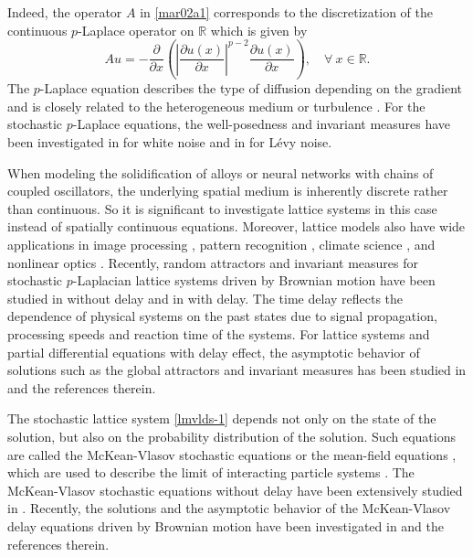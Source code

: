 \documentclass[11pt]{article}
\numberwithin{equation}{section}
\theoremstyle{plain}
\begin{document}
Indeed, the 
operator 
$A$ in \eqref{mar02a1} 
corresponds to the
discretization of the 
continuous $p$-Laplace
operator on 
$\mathbb{R}$ 
which is given by
 $$
   Au
   =    - \frac{\partial}{\partial x}                               \left(  \left|\frac{\partial u(x)}{\partial x} \right|^{p-2}
    \frac{\partial u(x)}{\partial x}
         \right) ,
         \quad \forall\  x\in \mathbb{R} .
$$
 The $p$-Laplace equation   describes  the type of diffusion depending on the gradient and is closely related to the heterogeneous medium or turbulence \cite{dt1994SIMA, ev1988ARMA}.
 For 
 the stochastic $p$-Laplace equations, 
 the well-posedness and invariant measures  have been investigated 
 in    \cite{sz2023SAA, bwang2026DCDSB, wliu2009JMAA, gt2016SIMA, wct2024JDE}
 for white noise
 and
 in    
  \cite{blz2014NA, neelima2022PA, km2025JEE} for
  L\'{e}vy noise.
  
   
  When modeling the solidification of alloys or neural networks with chains of coupled oscillators, the underlying spatial medium is inherently discrete rather than continuous.
  So it is significant to investigate lattice systems in 
 this case   instead of spatially continuous equations.  
  Moreover, lattice models also have wide applications in image processing \cite{cr1993IEEE}, pattern recognition \cite{cm1995IEEE}, climate science \cite{MT2016CPAM}, and nonlinear optics \cite{cls2003Nature}. 
  Recently, random attractors and invariant measures for stochastic $p$-Laplacian lattice systems
  driven by Brownian motion
   have been studied in \cite{WW2020SPA, WG2025Non} without  delay and 
   in \cite{ZL2025AMO} with  delay.
 The time    delay reflects the dependence of 
 physical systems on the past states due to   signal propagation, processing speeds and reaction time of the systems.   
  For  lattice systems
   and partial differential equations with delay effect,   the 
  asymptotic behavior of solutions
  such as 
  the  global 
  attractors and invariant measures  
   has been 
  studied in  \cite{CMV2014DCDS, LYC2023SINUM, XCV2024QTDS, CW2025SPDEAC} and the references therein.
  
 The stochastic lattice system \eqref{lmvlds-1} depends not only on the state of the solution, but also on the probability distribution of the solution. Such  equations are called the McKean-Vlasov stochastic equations or the mean-field equations \cite{blpr2017AP, cdll2019}, which  are used to describe the limit of interacting particle systems \cite{lwz2021CMP}.
 The
 McKean-Vlasov stochastic equations
 without delay
  have been
  extensively  
  studied in 
   \cite{ad1995SPA, W2018SPA, wr2025WSP, HDS2021AP, RZ2021Ber, LMW2021AIHP, W2023Ber,HL2021AMO, LSZZ2023PA}.
   Recently, 
   the solutions and the asymptotic
   behavior of 
  the McKean-Vlasov   delay equations driven by Brownian motion
   have been
   investigated in
   \cite{HRW2019DCDS, bsy2022EJP, SSL2024arXiv} and the references therein.
   
\end{document}
